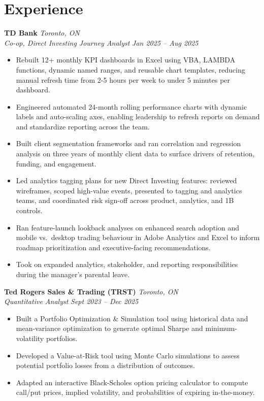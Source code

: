 \documentclass[11pt,letterpaper]{article}
\newcommand{\role}[4]{%
  \needspace{4\baselineskip}%
  \noindent\textbf{#1} \hfill \textit{#2} \\
  \textit{#3} \hfill \textit{#4} \\[-4pt]
}
\begin{document}
\section*{Experience}
\role{TD Bank}{Toronto, ON}{Co-op, Direct Investing Journey Analyst}{Jan 2025 -- Aug 2025}
\begin{itemize}
  \item Rebuilt 12+ monthly KPI dashboards in Excel using VBA, LAMBDA functions, dynamic named ranges, and reusable chart templates, reducing manual refresh time from 2-5 hours per week to under 5 minutes per dashboard.
  \item Engineered automated 24-month rolling performance charts with dynamic labels and auto-scaling axes, enabling leadership to refresh reports on demand and standardize reporting across the team.
  \item Built client segmentation frameworks and ran correlation and regression analysis on three years of monthly client data to surface drivers of retention, funding, and engagement.
  \item Led analytics tagging plans for new Direct Investing features: reviewed wireframes, scoped high-value events, presented to tagging and analytics teams, and coordinated risk sign-off across product, analytics, and 1B controls.
  \item Ran feature-launch lookback analyses on enhanced search adoption and mobile vs.\ desktop trading behaviour in Adobe Analytics and Excel to inform roadmap prioritization and executive-facing recommendations.
  \item Took on expanded analytics, stakeholder, and reporting responsibilities during the manager's parental leave.
\end{itemize}

\role{Ted Rogers Sales \& Trading (TRST)}{Toronto, ON}{Quantitative Analyst}{Sept 2023 -- Dec 2025}
\begin{itemize}
  \item Built a Portfolio Optimization \& Simulation tool using historical data and mean-variance optimization to generate optimal Sharpe and minimum-volatility portfolios.
  \item Developed a Value-at-Risk tool using Monte Carlo simulations to assess potential portfolio losses from a distribution of outcomes.
  \item Adapted an interactive Black-Scholes option pricing calculator to compute call/put prices, implied volatility, and probabilities of expiring in-the-money.
\end{itemize}
\end{document}
